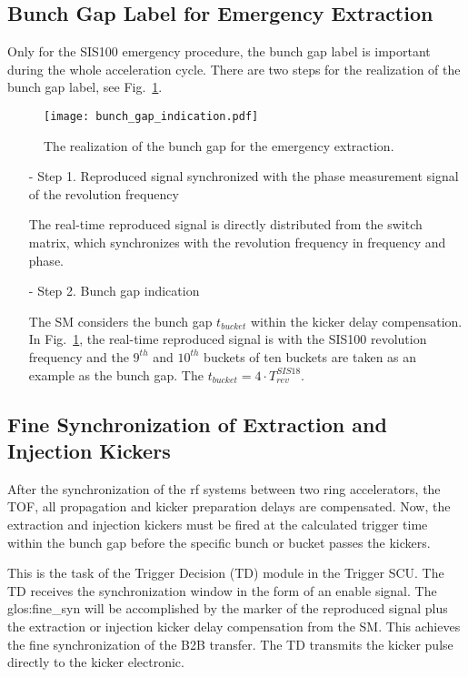 \subsection{Bunch Gap Label for Emergency Extraction}

Only for the SIS100 emergency procedure, the bunch gap label is important during the whole acceleration cycle. There are two steps for the realization of the bunch gap label, see Fig.~\ref{Emergency_label}.
\begin{figure}[!htb]
   \centering   
   \texttt{[image: bunch\_gap\_indication.pdf]}
   \caption{The realization of the bunch gap for the emergency extraction.}
   \label{Emergency_label}
\end{figure} 

\begin{itemize}
\item[-] Step 1. Reproduced signal synchronized with the phase measurement signal of the revolution frequency

The real-time reproduced signal is directly distributed from the switch matrix, which synchronizes with the revolution frequency in frequency and phase.
\item[-] Step 2. Bunch gap indication

The SM considers the bunch gap $t_{\mathit{bucket}}$ within the kicker delay compensation. In Fig.~\ref{Emergency_label}, the real-time reproduced signal is with the SIS100 revolution frequency and the $9^{th}$ and $10^{th}$ buckets of ten buckets are taken as an example as the bunch gap. The $t_{\mathit{bucket}}=4\cdot T_{\mathit{rev}}^{\mathit{SIS18}}$.

\end{itemize}



\subsection{Fine Synchronization of Extraction and Injection Kickers}
After the synchronization of the rf systems between two ring accelerators, the TOF, all propagation and kicker preparation delays are compensated. Now, the extraction and injection kickers must be fired at the calculated trigger time within the bunch gap before the specific bunch or bucket passes the kickers.
 
This is the task of the Trigger Decision (TD) module in the Trigger SCU. The TD receives the  synchronization window in the form of an enable signal. The \gls{glos:fine_syn} will be accomplished by the marker of the reproduced signal plus the extraction or injection kicker delay compensation from the SM. This achieves the fine synchronization of the B2B transfer. The TD transmits the kicker pulse directly to the kicker electronic.  
 
